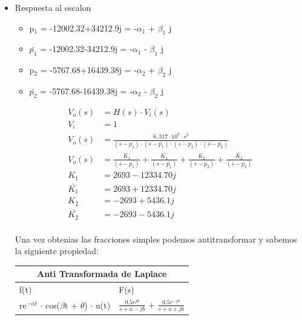 \documentclass[11pt]{diazessay} %
\begin{document}
\begin{itemize}
\item Respuesta al escalon\\

\begin{itemize}
	\item p$_{1}$ = -12002.32+34212.9j = -$\alpha_{1}$ + $\beta_{1}$ j\\
	\item $\bar{p_{1}}$ = -12002.32-34212.9j = -$\alpha_{1}$ - $\beta_{1}$ j\\
	\item p$_{2}$ = -5767.68+16439.38j = -$\alpha_{2}$ + $\beta_{2}$ j\\
	\item $\bar{p_{2}}$ = -5767.68-16439.38j = -$\alpha_{2}$ - $\beta_{2}$ j\\
\end{itemize}

\begin{align*}
V_{o}(s) &= H(s) \cdot V_{i}(s)\\[10pt]
V_{i} &= 1 \\[10pt]
V_{o}(s) &= \frac{6,317 \cdot 10^8 \cdot s^2}{(s - p_{1}) \cdot (s - \bar{p_{1}}) \cdot (s - p_{2}) \cdot (s - \bar{p_{2}})} \\[10pt]
V_{o}(s) &= \frac{K_{1}}{(s - p_{1})} + \frac{\bar{K_{1}}}{(s - \bar{p_{1}})} +  \frac{K_{2}}{(s - p_{2})} + \frac{\bar{K_{2}}}{(s - \bar{p_{2}})} \\[10pt]
K_{1} &= 2693 - 12334.70 j \\[10pt]
\bar{K_{1}} &= 2693 + 12334.70 j \\[10pt]
K_{2} &= -2693 + 5436.1 j \\[10pt]
\bar{K_{2}} &= -2693 - 5436.1 j \\[10pt]
\end{align*}

Una vez obtenias las fracciones simples podemos antitransformar y sabemos la siguiente propiedad: \\
\begin{tabular}{ |p{6cm}|p{6cm}|  }
 \hline
 \multicolumn{2}{|c|}{Anti Transformada de Laplace} \\
 \hline
 f(t)& F(s)\\
 \hline
 re$^{- \alpha t}$ $\cdot$ cos($\beta$t + $\theta$) $\cdot$ u(t)  & $\frac{0.5 r ^{j \theta}}{s + a -jb}$ + $\frac{0.5 r ^{-j \theta}}{s + a + jb}$ \\
 \hline
\end{tabular}\\


\end{itemize}
\end{document}

